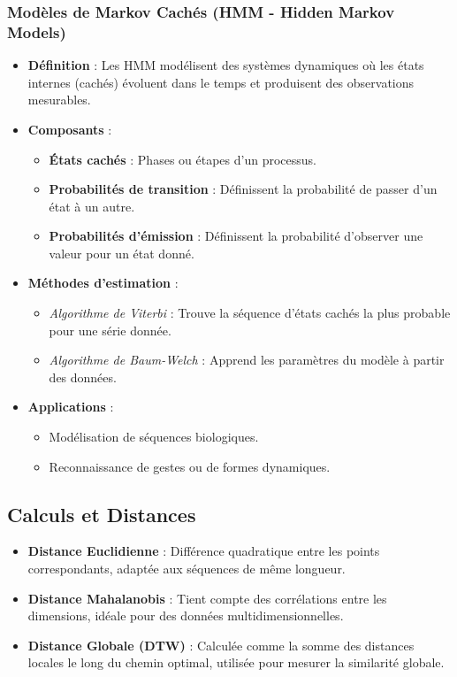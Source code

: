 \documentclass[a4paper,12pt,oneside]{report}	%
\begin{document}
            \subsubsection{Modèles de Markov Cachés (HMM - Hidden Markov Models)}
                \begin{itemize}
                    \item \textbf{Définition} : Les HMM modélisent des systèmes dynamiques où les états internes (cachés) évoluent dans le temps et produisent des observations mesurables.
                    \item \textbf{Composants} :
                        \begin{itemize}
                            \item \textbf{États cachés} : Phases ou étapes d’un processus.
                            \item \textbf{Probabilités de transition} : Définissent la probabilité de passer d’un état à un autre.
                            \item \textbf{Probabilités d’émission} : Définissent la probabilité d’observer une valeur pour un état donné.
                        \end{itemize}
                    \item \textbf{Méthodes d’estimation} :
                        \begin{itemize}
                            \item \textit{Algorithme de Viterbi} : Trouve la séquence d’états cachés la plus probable pour une série donnée.
                            \item \textit{Algorithme de Baum-Welch} : Apprend les paramètres du modèle à partir des données.
                        \end{itemize}
                \item \textbf{Applications} :
                \begin{itemize}
                    \item Modélisation de séquences biologiques.
                    \item Reconnaissance de gestes ou de formes dynamiques.
                \end{itemize}
            \end{itemize}
        \subsection{Calculs et Distances}
            \begin{itemize}
                \item \textbf{Distance Euclidienne} : Différence quadratique entre les points correspondants, adaptée aux séquences de même longueur.
                \item \textbf{Distance Mahalanobis} : Tient compte des corrélations entre les dimensions, idéale pour des données multidimensionnelles.
                \item \textbf{Distance Globale (DTW)} : Calculée comme la somme des distances locales le long du chemin optimal, utilisée pour mesurer la similarité globale.
            \end{itemize}       
\end{document}
